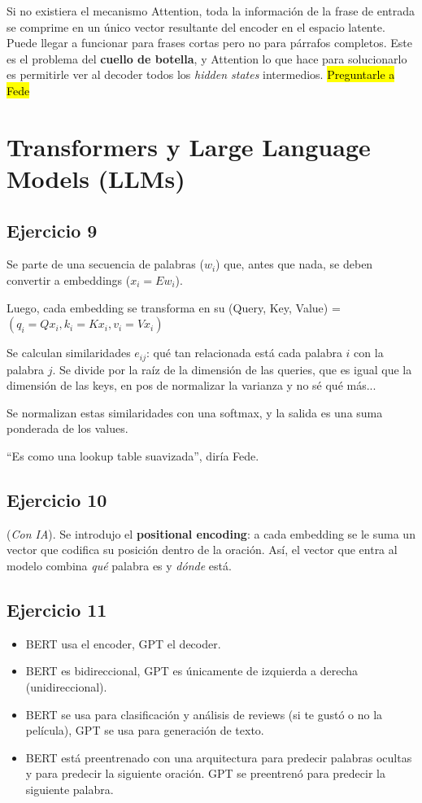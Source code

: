 \documentclass[a4paper,11pt]{article}
\begin{document}
Si no existiera el mecanismo Attention, toda la información de la frase de entrada se comprime en un único vector resultante del encoder en el espacio latente. Puede llegar a funcionar para frases cortas pero no para párrafos completos. Este es el problema del \textbf{cuello de botella}, y Attention lo que hace para solucionarlo es permitirle ver al decoder todos los \textit{hidden states} intermedios. \hl{Preguntarle a Fede}

\section*{Transformers y Large Language Models (LLMs)}
\subsection*{Ejercicio 9}
Se parte de una secuencia de palabras ($w_{i}$) que, antes que nada, se deben convertir a embeddings ($x_{i} = Ew_{i}$).

Luego, cada embedding se transforma en su (Query, Key, Value) = $(q_{i} = Qx_{i}, k_{i} = Kx_{i}, v_{i} = Vx_{i})$

Se calculan similaridades $e_{ij}$: qué tan relacionada está cada palabra $i$ con la palabra $j$. Se divide por la raíz de la dimensión de las queries, que es igual que la dimensión de las keys, en pos de normalizar la varianza y no sé qué más...

Se normalizan estas similaridades con una softmax, y la salida es una suma ponderada de los values.

``Es como una lookup table suavizada'', diría Fede.
\subsection*{Ejercicio 10}
(\textit{Con IA}). Se introdujo el \textbf{positional encoding}: a cada embedding se le suma un vector que codifica su posición dentro de la oración. Así, el vector que entra al modelo combina \emph{qué} palabra es y \emph{dónde} está.
\subsection*{Ejercicio 11}
\begin{itemize}
	\item BERT usa el encoder, GPT el decoder.
	\item BERT es bidireccional, GPT es únicamente de izquierda a derecha (unidireccional).
	\item BERT se usa para clasificación y análisis de reviews (si te gustó o no la película), GPT se usa para generación de texto.
	\item BERT está preentrenado con una arquitectura para predecir palabras ocultas y para predecir la siguiente oración. GPT se preentrenó para predecir la siguiente palabra.
\end{itemize}
\end{document}
